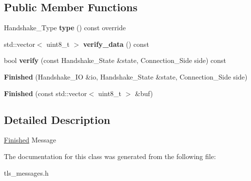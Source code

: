 \subsection*{Public Member Functions}
\begin{DoxyCompactItemize}
\item 
\mbox{\label{class_botan_1_1_t_l_s_1_1_finished_adf6906f27fa375ff6150aee8aa03422d}} 
Handshake\+\_\+\+Type {\bfseries type} () const override
\item 
\mbox{\label{class_botan_1_1_t_l_s_1_1_finished_a9f60def2faeaa788b8acb78d74f5b514}} 
std\+::vector$<$ uint8\+\_\+t $>$ {\bfseries verify\+\_\+data} () const
\item 
\mbox{\label{class_botan_1_1_t_l_s_1_1_finished_ad6ad321d710025bf3a40a23c4e39d9fa}} 
bool {\bfseries verify} (const Handshake\+\_\+\+State \&state, Connection\+\_\+\+Side side) const
\item 
\mbox{\label{class_botan_1_1_t_l_s_1_1_finished_a67768b72c401ce603187a43075809fa5}} 
{\bfseries Finished} (Handshake\+\_\+\+IO \&io, Handshake\+\_\+\+State \&state, Connection\+\_\+\+Side side)
\item 
\mbox{\label{class_botan_1_1_t_l_s_1_1_finished_a645619c4833b04258c892fabc63fedb3}} 
{\bfseries Finished} (const std\+::vector$<$ uint8\+\_\+t $>$ \&buf)
\end{DoxyCompactItemize}


\subsection{Detailed Description}
\hyperlink{class_botan_1_1_t_l_s_1_1_finished}{Finished} Message 

The documentation for this class was generated from the following file\+:\begin{DoxyCompactItemize}
\item 
tls\+\_\+messages.\+h\end{DoxyCompactItemize}
